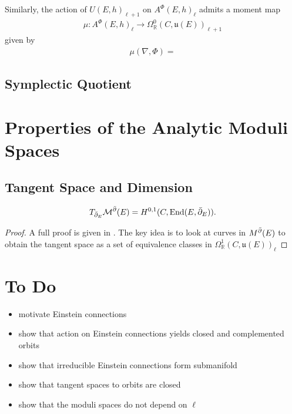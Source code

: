 \documentclass[12pt]{ociamthesis}  %
\begin{document}
\begin{example}
  Similarly, the action of $U(E,h)_{\ell+1}$ on $A^\Phi(E,h)_\ell$ admits a moment
  map 
  \begin{align*}
    \mu : A^\Phi(E,h)_\ell \to \Omega^0_{\mathbb{R}}(C,\mathfrak u(E))_{\ell+1}
  \end{align*}
  given by
  \begin{align*}
    \mu(\nabla,\Phi) = 
  \end{align*}
\end{example}

\subsection{Symplectic Quotient}

\section{Properties of the Analytic Moduli Spaces}

\subsection{Tangent Space and Dimension}

\begin{theorem}
  \begin{align*}
    T_{\bar{\partial}_E}\mathcal M^{\bar{\partial}}(E) = H^{0,1}(C,\operatorname{End}(E,\bar{\partial}_E)).
  \end{align*}
  \begin{proof}
    A full proof is given in \cite[223-225]{kobayashi1987}. The key idea is to look
    at curves in $M^{\bar{\partial}}(E)$ to obtain the tangent space as a set of equivalence
    classes in $\Omega^1_{\mathbb{R}}(C,\mathfrak u(E))_\ell$
    \missingproof
  \end{proof}
\end{theorem}

\section{To Do}

\begin{itemize}
  \item motivate Einstein connections
  \item show that action on Einstein connections yields closed and complemented orbits
  \item show that irreducible Einstein connections form submanifold
  \item show that tangent spaces to orbits are closed
  \item show that the moduli spaces do not depend on $\ell$
\end{itemize}
\end{document}
